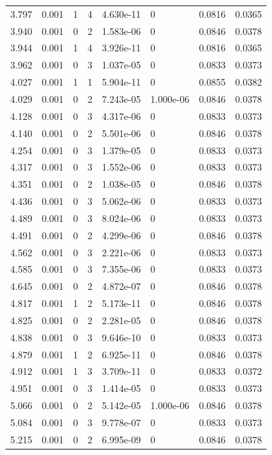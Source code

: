 \documentclass[preview]{standalone}
\begin{document}
{{{\begin{tabular}{L{1.2cm}C{1.2cm} C{0.3cm}C{0.5cm} C{1.4cm}C{1.4cm} C{1.4cm}C{1.4cm}}
  3.797  &  0.001  & 1     &  4 &  4.630e-11  & 0  & 0.0816 &  0.0365   \\ 
  3.940  &  0.001  & 0     &  2 &  1.583e-06  & 0  & 0.0846 &  0.0378   \\ 
  3.944  &  0.001  & 1     &  4 &  3.926e-11  & 0  & 0.0816 &  0.0365   \\ 
  3.962  &  0.001  & 0     &  3 &  1.037e-05  & 0  & 0.0833 &  0.0373   \\ 
  4.027  &  0.001  & 1     &  1 &  5.904e-11  & 0  & 0.0855 &  0.0382   \\ 
  4.029  &  0.001  & 0     &  2 &  7.243e-05  & 1.000e-06  & 0.0846 &  0.0378   \\ 
  4.128  &  0.001  & 0     &  3 &  4.317e-06  & 0  & 0.0833 &  0.0373   \\ 
  4.140  &  0.001  & 0     &  2 &  5.501e-06  & 0  & 0.0846 &  0.0378   \\ 
  4.254  &  0.001  & 0     &  3 &  1.379e-05  & 0  & 0.0833 &  0.0373   \\ 
  4.317  &  0.001  & 0     &  3 &  1.552e-06  & 0  & 0.0833 &  0.0373   \\ 
  4.351  &  0.001  & 0     &  2 &  1.038e-05  & 0  & 0.0846 &  0.0378   \\ 
  4.436  &  0.001  & 0     &  3 &  5.062e-06  & 0  & 0.0833 &  0.0373   \\ 
  4.489  &  0.001  & 0     &  3 &  8.024e-06  & 0  & 0.0833 &  0.0373   \\ 
  4.491  &  0.001  & 0     &  2 &  4.299e-06  & 0  & 0.0846 &  0.0378   \\ 
  4.562  &  0.001  & 0     &  3 &  2.221e-06  & 0  & 0.0833 &  0.0373   \\ 
  4.585  &  0.001  & 0     &  3 &  7.355e-06  & 0  & 0.0833 &  0.0373   \\ 
  4.645  &  0.001  & 0     &  2 &  4.872e-07  & 0  & 0.0846 &  0.0378   \\ 
  4.817  &  0.001  & 1     &  2 &  5.173e-11  & 0  & 0.0846 &  0.0378   \\ 
  4.825  &  0.001  & 0     &  2 &  2.281e-05  & 0  & 0.0846 &  0.0378   \\ 
  4.838  &  0.001  & 0     &  3 &  9.646e-10  & 0  & 0.0833 &  0.0373   \\ 
  4.879  &  0.001  & 1     &  2 &  6.925e-11  & 0  & 0.0846 &  0.0378   \\ 
  4.912  &  0.001  & 1     &  3 &  3.709e-11  & 0  & 0.0833 &  0.0372   \\ 
  4.951  &  0.001  & 0     &  3 &  1.414e-05  & 0  & 0.0833 &  0.0373   \\ 
  5.066  &  0.001  & 0     &  2 &  5.142e-05  & 1.000e-06  & 0.0846 &  0.0378   \\ 
  5.084  &  0.001  & 0     &  3 &  9.778e-07  & 0  & 0.0833 &  0.0373   \\ 
  5.215  &  0.001  & 0     &  2 &  6.995e-09  & 0  & 0.0846 &  0.0378   \\ 
\hline 
\end{tabular} 

}}}
\end{document}
